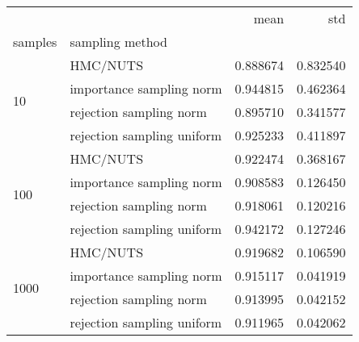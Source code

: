 \begin{tabular}{llrr}
\toprule
 &  & mean & std \\
samples & sampling method &  &  \\
\midrule
\multirow[t]{4}{*}{10} & HMC/NUTS & 0.888674 & 0.832540 \\
 & importance sampling norm & 0.944815 & 0.462364 \\
 & rejection sampling norm & 0.895710 & 0.341577 \\
 & rejection sampling uniform & 0.925233 & 0.411897 \\
\cline{1-4}
\multirow[t]{4}{*}{100} & HMC/NUTS & 0.922474 & 0.368167 \\
 & importance sampling norm & 0.908583 & 0.126450 \\
 & rejection sampling norm & 0.918061 & 0.120216 \\
 & rejection sampling uniform & 0.942172 & 0.127246 \\
\cline{1-4}
\multirow[t]{4}{*}{1000} & HMC/NUTS & 0.919682 & 0.106590 \\
 & importance sampling norm & 0.915117 & 0.041919 \\
 & rejection sampling norm & 0.913995 & 0.042152 \\
 & rejection sampling uniform & 0.911965 & 0.042062 \\
\cline{1-4}
\bottomrule
\end{tabular}
